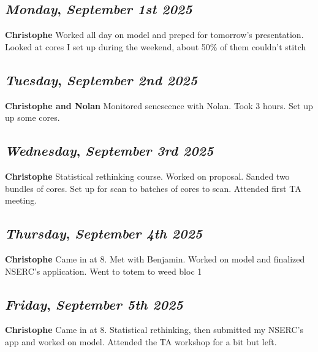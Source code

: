 \begin{center}
\section*{\month}
\end{center}

\def\day{\textit{September 1st 2025}}
\def\weekday{\textit{Monday}}
\subsection*{\weekday, \day}
\textbf {Christophe}
Worked all day on model and preped for tomorrow's presentation. Looked at cores I set up during the weekend, about 50\% of them couldn't stitch

\def\day{\textit{September 2nd 2025}}
\def\weekday{\textit{Tuesday}}
\subsection*{\weekday, \day}
\textbf {Christophe and Nolan}
Monitored senescence with Nolan. Took 3 hours. Set up up some cores.

\def\day{\textit{September 3rd 2025}}
\def\weekday{\textit{Wednesday}}
\subsection*{\weekday, \day}
\textbf {Christophe}
Statistical rethinking course. Worked on proposal. Sanded two bundles of cores. Set up for scan to batches of cores to scan. Attended first TA meeting. 

\def\day{\textit{September 4th 2025}}
\def\weekday{\textit{Thursday}}
\subsection*{\weekday, \day}
\textbf {Christophe}
Came in at 8. Met with Benjamin. Worked on model and finalized NSERC's application. Went to totem to weed bloc 1

\def\day{\textit{September 5th 2025}}
\def\weekday{\textit{Friday}}
\subsection*{\weekday, \day}
\textbf {Christophe}
Came in at 8. Statistical rethinking, then submitted my NSERC's app and worked on model. Attended the TA workshop for a bit but left. 

\def\day{\textit{September 8th 2025}}
\def\weekday{\textit{Monday}}
